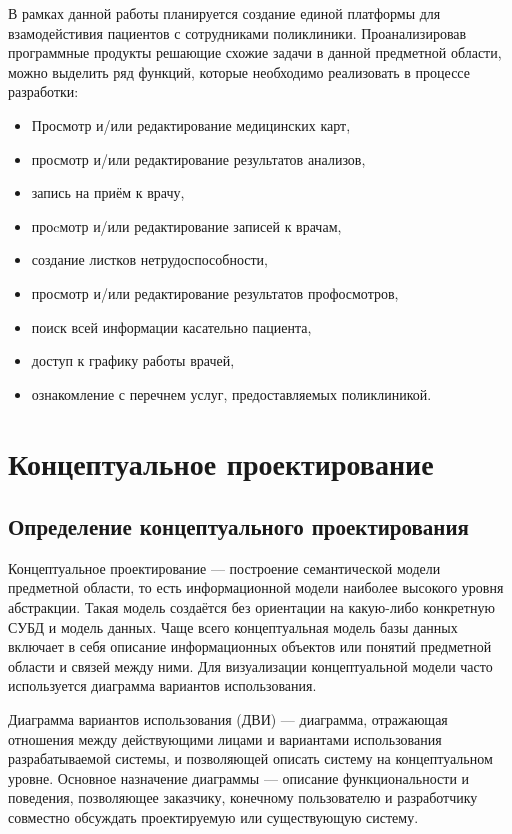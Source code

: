\documentclass[14pt,a4paper,russian]{extreport}
\begin{document}
В рамках данной работы планируется создание единой платформы для
взамодейстивия пациентов с сотрудниками поликлиники. Проанализировав программные продукты решающие
схожие задачи в данной предметной области, можно выделить ряд функций, которые необходимо
реализовать в процессе разработки:
\begin{itemize}[noitemsep]
		
\renewcommand\labelitemi{--}
            \item Просмотр и/или редактирование медицинских карт,
            \item просмотр и/или редактирование результатов анализов,
            \item запись на приём к врачу,
            \item проcмотр и/или редактирование записей к врачам,
            \item создание листков нетрудоспособности,
            \item просмотр и/или редактирование результатов профосмотров,
            \item поиск всей информации касательно пациента,
            \item доступ к графику работы врачей,
            \item ознакомление с перечнем услуг, предоставляемых поликлиникой.
\end{itemize}


\chapter{Концептуальное проектирование}
\section{Определение концептуального проектирования}
Концептуальное проектирование — построение семантической модели предметной
области, то есть информационной модели наиболее высокого уровня абстракции. Такая модель создаётся
без ориентации на какую-либо конкретную СУБД и модель данных.
Чаще всего концептуальная модель базы данных включает в себя описание информационных объектов 
или понятий предметной области и связей между ними. Для визуализации концептуальной
модели часто используется диаграмма вариантов использования.\par
Диаграмма вариантов использования (ДВИ) — диаграмма, отражающая
отношения между действующими лицами и вариантами использования разрабатываемой системы, и
позволяющей описать систему на концептуальном уровне.
Основное назначение диаграммы — описание функциональности и поведения, позволяющее заказчику,
конечному пользователю и разработчику совместно обсуждать проектируемую или существующую
систему.\par
\end{document}
